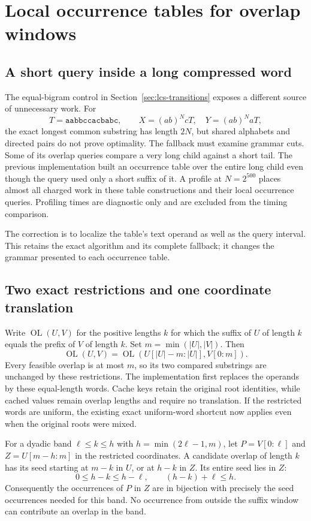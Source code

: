\section{Local occurrence tables for overlap windows}
\label{sec:lcs-windows}

\subsection{A short query inside a long compressed word}

The equal-bigram control in Section~\ref{sec:lcs-transitions} exposes a
different source of unnecessary work. For
\[
 T=\mathtt{aabbccacbabc},\qquad
 X=(ab)^NcT,\quad Y=(ab)^NaT,
\]
the exact longest common substring has length $2N$, but shared alphabets
and directed pairs do not prove optimality. The fallback must examine
grammar cuts. Some of its overlap queries compare a very long child
against a short tail. The previous implementation built an occurrence
table over the entire long child even though the query used only a short
suffix of it. A profile at $N=2^{500}$ places almost all charged work in
these table constructions and their local occurrence queries. Profiling
times are diagnostic only and are excluded from the timing comparison.

The correction is to localize the table's text operand as well as the
query interval. This retains the exact algorithm and its complete
fallback; it changes the grammar presented to each occurrence table.

\subsection{Two exact restrictions and one coordinate translation}

Write $\operatorname{OL}(U,V)$ for the positive lengths $k$ for which
the suffix of $U$ of length $k$ equals the prefix of $V$ of length $k$.
Set $m=\min(|U|,|V|)$. Then
\[
 \operatorname{OL}(U,V)
 =\operatorname{OL}(U[|U|-m:|U|],V[0:m]).
\]
Every feasible overlap is at most $m$, so its two compared substrings
are unchanged by these restrictions. The implementation first replaces
the operands by these equal-length words. Cache keys retain the original
root identities, while cached values remain overlap lengths and require
no translation. If the restricted words are uniform, the existing exact
uniform-word shortcut now applies even when the original roots were mixed.

For a dyadic band $\ell\le k\le h$ with
$h=\min(2\ell-1,m)$, let $P=V[0:\ell]$ and $Z=U[m-h:m]$ in the
restricted coordinates. A candidate overlap of length $k$ has its seed
starting at $m-k$ in $U$, or at $h-k$ in $Z$. Its entire seed lies in $Z$:
\[
 0\le h-k\le h-\ell,\qquad (h-k)+\ell\le h.
\]
Consequently the occurrences of $P$ in $Z$ are in bijection with precisely
the seed occurrences needed for this band. No occurrence from outside
the suffix window can contribute an overlap in the band.

